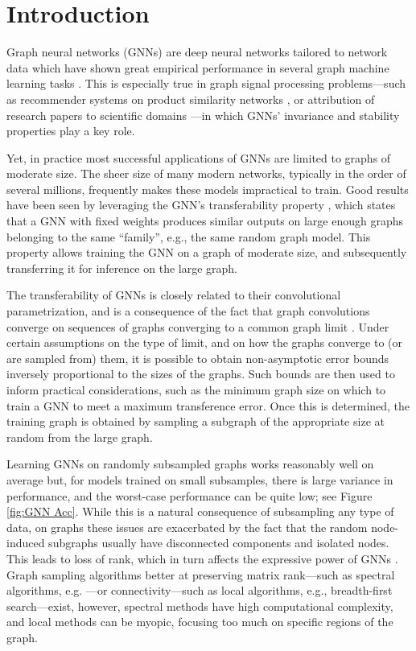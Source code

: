 \section{Introduction}
\label{sec:intro}

Graph neural networks (GNNs) are deep neural networks tailored to network data which have shown great empirical performance in several graph machine learning tasks \cite{gori2005new,kipf17-classifgcnn,defferrard17-cnngraphs,gama18-gnnarchit}. This is especially true in graph signal processing problems---such as recommender systems on product similarity networks \cite{ruiz2020gnns}, or attribution of research papers to scientific domains \cite{hamilton2017inductive}---in which GNNs' invariance and stability properties play a key role. 

Yet, in practice most successful applications of GNNs are limited to graphs of moderate size. The sheer size of many modern networks, typically in the order of several millions, frequently makes these models impractical to train. Good results have been seen by leveraging the GNN's transferability property \cite{ruiz20-transf,levie2019transferability}, which states that a GNN with fixed weights produces similar outputs on large enough graphs belonging to the same ``family'', e.g., the same random graph model. This property allows training the GNN on a graph of moderate size, and subsequently transferring it for inference on the large graph.

The transferability of GNNs is closely related to their convolutional parametrization, and is a consequence of the fact that graph convolutions converge on sequences of graphs converging to a common graph limit \cite{ruiz2020graphonsp}. Under certain assumptions on the type of limit, and on how the graphs converge to (or are sampled from) them, it is possible to obtain non-asymptotic error bounds inversely proportional to the sizes of the graphs. Such bounds are then used to inform practical considerations, such as the minimum graph size on which to train a GNN to meet a maximum transference error. Once this is determined, the training graph is obtained by sampling a subgraph of the appropriate size at random from the large graph.

Learning GNNs on randomly subsampled graphs works reasonably well on average but, for models trained on small subsamples, there is large variance in performance, and the worst-case performance can be quite low; see Figure \ref{fig:GNN Acc}. While this is a natural consequence of subsampling any type of data, on graphs these issues are exacerbated by the fact that the random node-induced subgraphs usually have disconnected components and isolated nodes. This leads to loss of rank, which in turn affects the expressive power of GNNs \cite{ruiz2024spectral}.
Graph sampling algorithms better at preserving matrix rank---such as spectral algorithms, e.g. \cite{chen2015discrete,anis2016efficient}---or connectivity---such as local algorithms, e.g., breadth-first search---exist, however, spectral methods have high computational complexity, and local methods can be myopic, focusing too much on specific regions of the graph.


